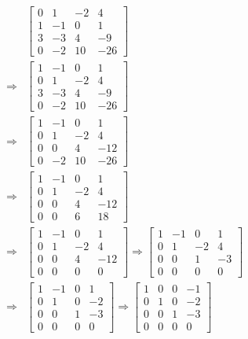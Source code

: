\documentclass[12pt,a4paper]{article}
\begin{document}
\begin{align*}
	&\begin{bmatrix}
		0 & 1 & -2 & 4\\
		1 & -1 & 0 & 1\\
		3 & -3 & 4 & -9\\
		0 & -2 & 10 & -26
	\end{bmatrix} \\
	\Rightarrow &\begin{bmatrix}
		1 & -1 & 0 & 1\\
		0 & 1 & -2 & 4\\
		3 & -3 & 4 & -9\\
		0 & -2 & 10 & -26
	\end{bmatrix} \\
	\Rightarrow &\begin{bmatrix}
		1 & -1 & 0 & 1\\
		0 & 1 & -2 & 4\\
		0 & 0 & 4 &  -12\\
		0 & -2 & 10 & -26
	\end{bmatrix} \\
		\Rightarrow &\begin{bmatrix}
		1 & -1 & 0 & 1\\
		0 & 1 & -2 & 4\\
		0 & 0 & 4 &  -12\\
		0 & 0 & 6 & 18
	\end{bmatrix} \\
	\Rightarrow &\begin{bmatrix}
		1 & -1 & 0 & 1\\
		0 & 1 & -2 & 4\\
		0 & 0 & 4 &  -12\\
		0 & 0 & 0 &  0
	\end{bmatrix} \Rightarrow \begin{bmatrix}
	1 & -1 & 0 & 1\\
	0 & 1 & -2 & 4\\
	0 & 0 & 1 &  -3\\
	0 & 0 & 0 & 0
	\end{bmatrix} \\
	\Rightarrow &\begin{bmatrix}
		1 & -1 & 0 & 1\\
		0 & 1 & 0 & -2\\
		0 & 0 & 1 &  -3\\
		0 & 0 & 0 & 0
	\end{bmatrix}\Rightarrow \begin{bmatrix}
	1 & 0 & 0 & -1\\
	0 & 1 &  0& -2\\
	0 & 0 & 1 &  -3\\
	0 & 0 & 0 & 0
	\end{bmatrix}  
\end{align*}
\end{document}
